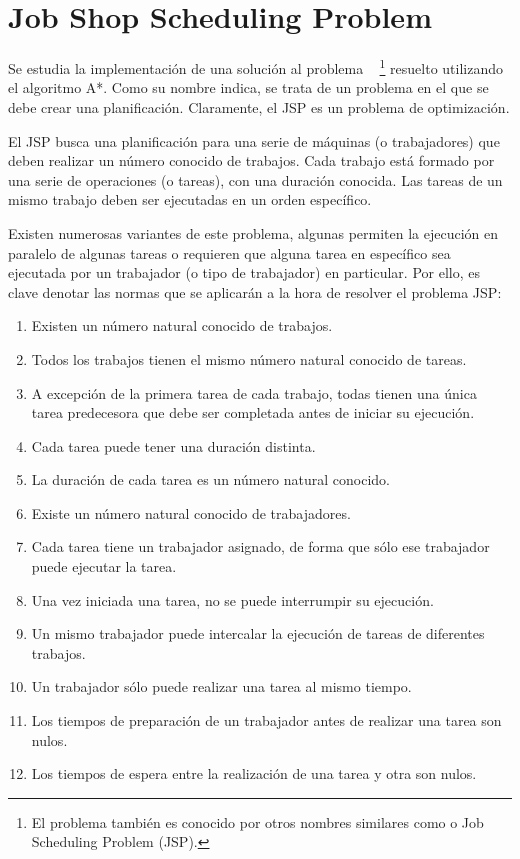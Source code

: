 
\section{Job Shop Scheduling Problem}

Se estudia la implementación de una solución al problema
~\cite{Yan77}
\footnote{El problema también es conocido por otros nombres similares
como  o Job Scheduling Problem (JSP).}
resuelto utilizando el algoritmo A*.
Como su nombre indica, se trata de un problema en el que se debe
crear una planificación.
Claramente, el JSP es un problema de optimización.

El JSP busca una planificación para una serie de
máquinas (o trabajadores) que deben realizar un número conocido
de trabajos.
Cada trabajo está formado por una serie de operaciones (o tareas),
con una duración conocida.
Las tareas de un mismo trabajo deben ser ejecutadas en un orden específico.

Existen numerosas variantes de este problema,
algunas permiten la ejecución
en paralelo de algunas tareas o requieren que alguna tarea
en específico sea ejecutada por un trabajador (o tipo de trabajador)
en particular.
Por ello, es clave denotar las normas que se aplicarán a la hora de resolver
el problema JSP\@:

\begin{enumerate}[itemsep=0.25px]
    \item Existen un número natural conocido de trabajos.
    \item Todos los trabajos tienen el mismo número natural conocido de tareas.
    \item A excepción de la primera tarea de cada trabajo,
    todas tienen una única tarea predecesora que debe ser completada
    antes de iniciar su ejecución.
    \item Cada tarea puede tener una duración distinta.
    \item La duración de cada tarea es un número natural conocido.
    \item Existe un número natural conocido de trabajadores.
    \item Cada tarea tiene un trabajador asignado,
    de forma que sólo ese trabajador puede ejecutar la tarea.
    \item Una vez iniciada una tarea, no se puede interrumpir su ejecución.
    \item Un mismo trabajador puede intercalar la ejecución de tareas de diferentes trabajos.
    \item Un trabajador sólo puede realizar una tarea al mismo tiempo.
    \item Los tiempos de preparación de un trabajador antes de realizar una tarea son nulos.
    \item Los tiempos de espera entre la realización de una tarea y otra son nulos.
\end{enumerate}

